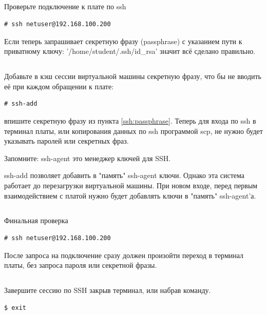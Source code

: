 \subsection{} Проверьте подключение к плате по ssh
\begin{lstlisting}[style=bash]
# ssh netuser@192.168.100.200
\end{lstlisting}
Если теперь запрашивает секретную фразу (passphrase) с указанием пути к приватному ключу: '/home/student/.ssh/id\_rsa' значит всё сделано правильно.

\subsection{} Добавьте в кэш сессии виртуальной машины секретную фразу, что бы не вводить её при каждом обращении к плате:
\begin{lstlisting}[style=bash]
# ssh-add
\end{lstlisting}
впишите секретную фразу из пункта \ref{ssh:passphrase}. Теперь для входа по ssh в терминал платы, или копирования данных по ssh программой scp, не нужно будет указывать паролей или секретных фраз.  

\begin{Notes}{Запомните:}
ssh-agent это менеджер ключей для SSH. 

ssh-add позволяет добавить в "память" ssh-agent ключи. Однако эта система работает до перезагрузки виртуальной машины. При новом входе, перед первым взаимодействием с платой нужно будет добавлять ключи в "память" ssh-agent'а.
\end{Notes}

\subsection{}Финальная проверка
\begin{lstlisting}[style=bash]
# ssh netuser@192.168.100.200
\end{lstlisting}
После запроса на подключение сразу должен произойти переход в терминал платы, без запроса пароля или секретной фразы.

\subsection{} Завершите сессию по SSH закрыв терминал, или набрав команду. 
\begin{lstlisting}[style=bash]
$ exit
\end{lstlisting}


